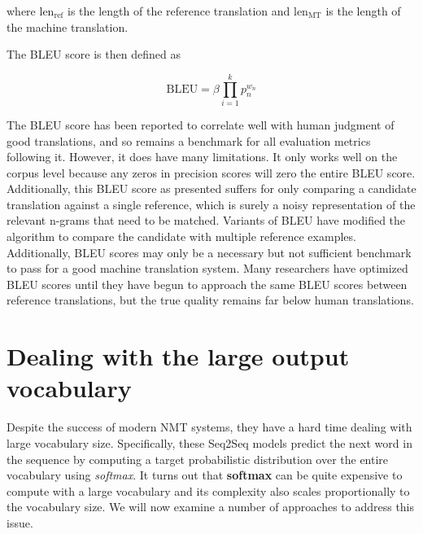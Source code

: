 \documentclass{tufte-handout}
\begin{document}
where $\text{len}_\text{ref}$ is the length of the reference translation and $\text{len}_\text{MT}$ is the length of the machine translation.

The BLEU score is then defined as

\begin{equation*}
\text{BLEU} = \beta\prod_{i=1}^k p_n^{w_n}
\end{equation*}

The BLEU score has been reported to correlate well with human judgment of good translations, and so remains a benchmark for all evaluation metrics following it. However, it does have many limitations. It only works well on the corpus level because any zeros in precision scores will zero the entire BLEU score. Additionally, this BLEU score as presented suffers for only comparing a candidate translation against a single reference, which is surely a noisy representation of the relevant n-grams that need to be matched. Variants of BLEU have modified the algorithm to compare the candidate with multiple reference examples.
Additionally, BLEU scores may only be a necessary but not sufficient benchmark to pass for a good machine translation system. Many researchers have optimized BLEU scores until they have begun to approach the same BLEU scores between reference translations, but the true quality remains far below human translations.

\section{Dealing with the large output vocabulary}
Despite the success of modern NMT systems, they have a hard time dealing with large vocabulary size. Specifically, these Seq2Seq models predict the next word in the sequence by computing a target probabilistic distribution over the entire vocabulary using \textit{softmax}. It turns out that \textbf{softmax} can be quite expensive to compute with a large vocabulary and its complexity also scales proportionally to the vocabulary size. We will now examine a number of approaches to address this issue.
\end{document}
